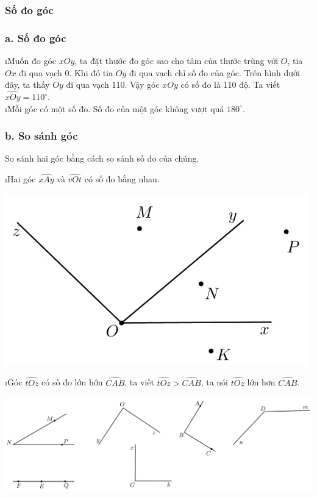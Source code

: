 \subsubsection{Số đo góc}
\subsubsection*{a. Số đo góc}
\begin{enumerate}[--,leftmargin=*]
	\i Muốn đo góc $xOy$, ta đặt thước đo góc sao cho tâm của thước trùng với $O$, tia $Ox$ đi qua vạch $0$. Khi đó tia $Oy$ đi qua vạch chỉ số đo của góc. Trên hình dưới đây, ta thấy $Oy$ đi qua vạch 110. Vậy góc $xOy$ có số đo là 110 độ. Ta viết $\widehat{xOy}={{110}^\circ}$.\\
	\i Mỗi góc có một số đo. Số đo của một góc không vượt quá ${{180}^\circ}$.
\end{enumerate}
\subsubsection*{b. So sánh góc}
So sánh hai góc bằng cách so sánh số đo của chúng.
\begin{enumerate}[--,leftmargin=*]
	\i Hai góc $\widehat{xAy}$ và $\widehat{vOt}$ có số đo bằng nhau.
	\begin{center}
		\includegraphics[width= 0.5\linewidth]{vd-30-4}
	\end{center}
	\i Góc $\widehat{tOz}$ có số đo lớn hớn $\widehat{CAB}$, ta viết $\widehat{tOz}>\widehat{CAB}$, ta nói $\widehat{tOz}$ lớn hơn $\widehat{CAB}$.
	\begin{center}
		\includegraphics[width= 0.5\linewidth]{vd-30-5}
	\end{center}
\end{enumerate}
